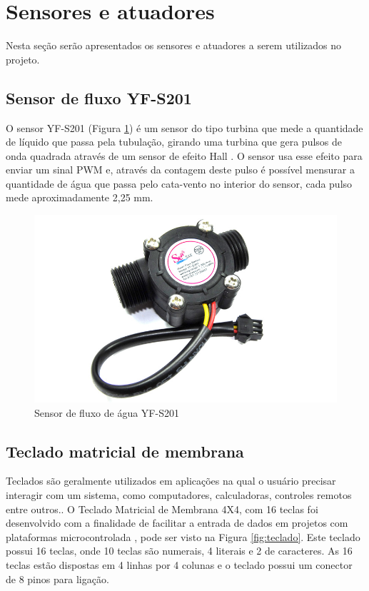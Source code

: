 \section{Sensores e atuadores}

Nesta seção serão apresentados os sensores e atuadores a serem utilizados no projeto. 

\subsection{Sensor de fluxo YF-S201}

O sensor YF-S201 (Figura \ref{fig:sensor}) é um sensor do tipo turbina que mede a quantidade de líquido que passa pela tubulação, girando uma turbina que
gera pulsos de onda quadrada através de um sensor de efeito Hall \cite{roque2018sistema}. O
sensor usa esse efeito para enviar um sinal PWM e, através da contagem deste pulso é possível mensurar a quantidade de água que passa pelo cata-vento no interior do sensor, cada pulso mede aproximadamente 2,25 mm.\cite{ms2017automaccao}

\begin{figure}[htbp]
		\centering
		\includegraphics[scale=0.3]{figuras/yf-s201.jpg}
		\caption{Sensor de fluxo de água YF-S201}
		\label{fig:sensor}
\end{figure}

\subsection{Teclado matricial de membrana}

Teclados são geralmente utilizados em aplicações na qual o usuário precisar interagir com um sistema, como computadores, calculadoras, controles remotos entre outros.\cite{teclado-matricial-1}. O Teclado Matricial de Membrana 4X4, com 16 teclas foi desenvolvido com a finalidade de facilitar a entrada de dados em projetos com plataformas microcontrolada \cite{teclado-matricial}, pode ser visto na Figura \ref{fig:teclado}. Este teclado possui 16 teclas, onde 10 teclas são numerais, 4 literais e 2 de caracteres. As 16 teclas estão dispostas em 4 linhas por 4 colunas e o teclado possui um conector de 8 pinos para ligação.

